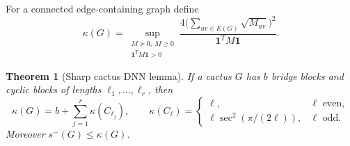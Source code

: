 \documentclass[11pt]{article}
\newtheorem{theorem}{Theorem}[section]
\theoremstyle{remark}
\newcommand{\one}{\mathbf 1}
\begin{document}
For a connected edge-containing graph define
\begin{equation}\label{eq:kappa}
 \kappa(G)=\sup_{\substack{M\succeq0,\ M\geq0\\\one^TM\one>0}}
 \frac{4\bigl(\sum_{uv\in E(G)}\sqrt{M_{uv}}\bigr)^2}
 {\one^TM\one}.
\end{equation}

\begin{theorem}[Sharp cactus DNN lemma]\label{thm:dnn}
If a cactus $G$ has $b$ bridge blocks and cyclic blocks of lengths
$\ell_1,\ldots,\ell_r$, then
\begin{equation}\label{eq:block-kappa}
 \kappa(G)=b+\sum_{j=1}^r\kappa(C_{\ell_j}),\qquad
 \kappa(C_\ell)=\begin{cases}
 \ell,&\ell\text{ even},\\
 \ell\sec^2(\pi/(2\ell)),&\ell\text{ odd}.
 \end{cases}
\end{equation}
Moreover $s^-(G)\leq\kappa(G)$.
\end{theorem}
\end{document}
